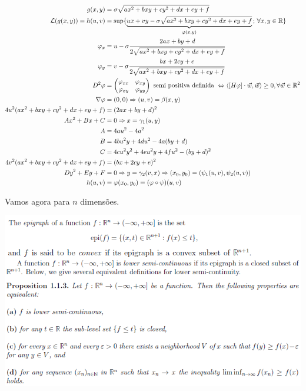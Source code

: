 \documentclass[12pt]{article}
\begin{document}
\begin{align}
g(x,y) &= \sigma \sqrt{ax^2 + bxy + cy^2 + dx + ey + f} \\
\mathcal{L}(g(x,y)) = h(u,v) &= \sup \{ \underbrace{ux + vy - \sigma \sqrt{ax^2 + bxy + cy^2 + dx + ey + f}}_{\varphi(x,y)}\,;\,\forall x,y \in \mathbb{R} \} \\
\varphi_x &= u - \sigma \cfrac{2ax + by + d}{2\sqrt{ax^2 + bxy + cy^2 + dx + ey + f}} \\
\varphi_y &= v - \sigma \cfrac{bx + 2cy + e}{2\sqrt{ax^2 + bxy + cy^2 + dx + ey + f}} \\
D^2 \varphi &= \begin{pmatrix} \varphi_{xx} & \varphi_{xy} \\ \varphi_{xy} & \varphi_{yy} \end{pmatrix}\text{ semi positiva definida }\Leftrightarrow \langle [H\varphi]\cdot \vec w, \vec w\rangle \ge 0, \forall \vec w \in \mathbb{R}^2 \\
\nabla \varphi &= (0, 0) \Rightarrow (u,v) = \beta(x,y) \\
4u^2 (ax^2 + bxy + cy^2 + dx + ey + f) &= (2ax + by + d)^2 \\
Ax^2 + Bx + C &= 0 \Rightarrow x = \gamma_1(u, y) \\
A &= 4au^2 - 4a^2 \\
B &= 4bu^2y + 4du^2 - 4a(by + d) \\
C &= 4cu^2y^2 + 4eu^2y + 4fu^2 - (by + d)^2 \\
4v^2 (ax^2 + bxy + cy^2 + dx + ey + f) &= (bx + 2cy + e)^2 \\
Dy^2 + Ey + F &= 0 \Rightarrow y = \gamma_2(v, x) \Rightarrow (x_0,y_0) = (\psi_1(u, v), \psi_2(u, v)) \\
h(u,v) &= \varphi(x_0, y_0) = (\varphi \circ \psi)(u, v)
\end{align}

Vamos agora para $n$ dimens\~oes.

\vspace{300mm}

		\begin{center}
		\includegraphics[scale=1.3]{1a}
		\end{center}
\end{document}
